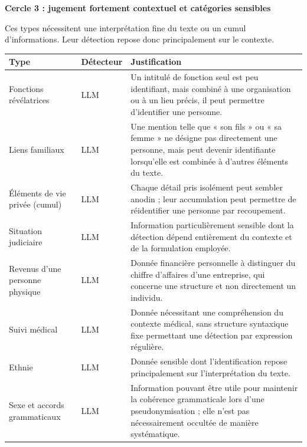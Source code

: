 \documentclass[12pt,a4paper]{article}
\begin{document}
\medskip
\noindent\textbf{Cercle 3 : jugement fortement contextuel et catégories sensibles}

\smallskip

Ces types nécessitent une interprétation fine du texte ou un cumul
d'informations. Leur détection repose donc principalement sur le contexte.

\begin{longtable}{
    p{3.2cm}
    @{\hspace{0.4cm}}
    p{1.8cm}
    @{\hspace{0.4cm}}
    p{8.5cm}
}
\toprule
\textbf{Type} & \textbf{Détecteur} & \textbf{Justification} \\
\midrule
\endhead

Fonctions révélatrices
& LLM
& Un intitulé de fonction seul est peu identifiant, mais combiné à une
organisation ou à un lieu précis, il peut permettre d'identifier une personne. \\

Liens familiaux
& LLM
& Une mention telle que « son fils » ou « sa femme » ne désigne pas directement
une personne, mais peut devenir identifiante lorsqu'elle est combinée à
d'autres éléments du texte. \\

Éléments de vie privée (cumul)
& LLM
& Chaque détail pris isolément peut sembler anodin ; leur accumulation peut
permettre de réidentifier une personne par recoupement. \\

Situation judiciaire
& LLM
& Information particulièrement sensible dont la détection dépend entièrement
du contexte et de la formulation employée. \\

Revenus d'une personne physique
& LLM
& Donnée financière personnelle à distinguer du chiffre d'affaires d'une
entreprise, qui concerne une structure et non directement un individu. \\

Suivi médical
& LLM
& Donnée nécessitant une compréhension du contexte médical, sans structure
syntaxique fixe permettant une détection par expression régulière. \\

Ethnie
& LLM
& Donnée sensible dont l'identification repose principalement sur
l'interprétation du texte. \\

Sexe et accords grammaticaux
& LLM
& Information pouvant être utile pour maintenir la cohérence grammaticale lors
d'une pseudonymisation ; elle n'est pas nécessairement occultée de manière
systématique. \\

\bottomrule
\end{longtable}

\newpage
\end{document}
